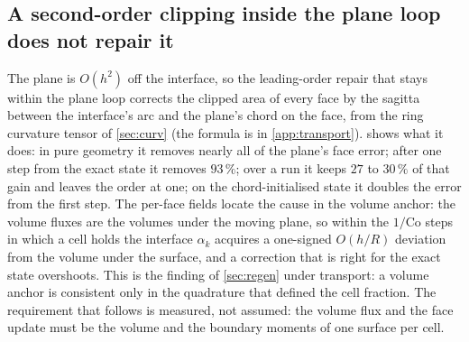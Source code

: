 \subsection{A second-order clipping inside the plane loop does not repair it}
\label{sec:tpf-sagitta}

The plane is $O(h^2)$ off the interface, so the leading-order repair that stays within the plane loop corrects the clipped area of every face by the sagitta between the interface's arc and the plane's chord on the face, from the ring curvature tensor of \cref{sec:curv} (the formula is in \ref{app:transport}).  shows what it does: in pure geometry it removes nearly all of the plane's face error; after one step from the exact state it removes $93\,\%$; over a run it keeps $27$ to $30\,\%$ of that gain and leaves the order at one; on the chord-initialised state it doubles the error from the first step. The per-face fields locate the cause in the volume anchor: the volume fluxes are the volumes under the moving plane, so within the $1/\mathrm{Co}$ steps in which a cell holds the interface $\alpha_k$ acquires a one-signed $O(h/R)$ deviation from the volume under the surface, and a correction that is right for the exact state overshoots. This is the finding of \cref{sec:regen} under transport: a volume anchor is consistent only in the quadrature that defined the cell fraction. The requirement that follows is measured, not assumed: the volume flux and the face update must be the volume and the boundary moments of one surface per cell.

